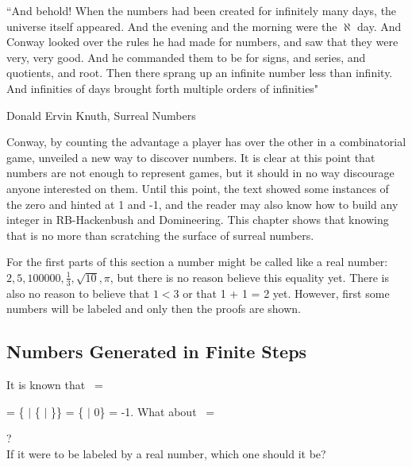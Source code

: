 \epigraph{``And behold! When the numbers had been created for infinitely many days, the universe itself appeared. And the evening and the morning were the $\aleph$ day. And Conway looked over the rules he had made for numbers, and saw that they were very, very good. And he commanded them to be for signs, and series, and quotients, and root. Then there sprang up an infinite number less than infinity. And infinities of days brought forth multiple orders of infinities"}{Donald Ervin Knuth, Surreal Numbers \footnotemark}



Conway, by counting the advantage a player has over the other in a combinatorial game, unveiled a new way to discover numbers. It is clear at this point that numbers are not enough to represent games, but it should in no way discourage anyone interested on them. Until this point, the text showed some instances of the zero and hinted at 1 and -1, and the reader may also know how to build any integer in RB-Hackenbush and Domineering. This chapter shows that knowing that is no more than scratching the surface of surreal numbers.

For the first parts of this section a number  might be called like a real number: $2, 5, 100000, \frac{1}{3}, \sqrt{10}, \pi$, but there is no reason believe this equality yet. There is also no reason to believe that $1 < 3$ or that 1 + 1 = 2 yet. However, first some numbers will be labeled and only then the proofs are shown.


\subsection*{Numbers Generated in Finite Steps}

It is known that \Gm\ =
 = \{ $|$ \{ $|$ \}\} = \{ $|$ 0\} = -1.
What about \Hm\ =  ?\\ If it were to be labeled by a real number, which one should it be?


